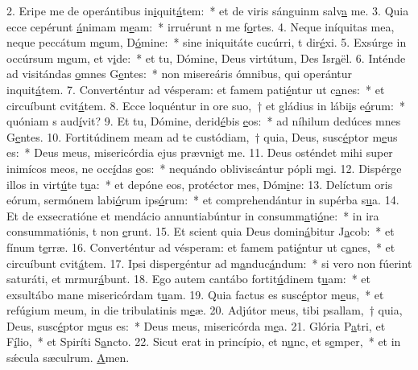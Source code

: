 2. Eripe me de operántibus in\uline{i}quit\uline{á}tem:~* et de viris sánguinm salv\uline{a} me.
3. Quia ecce cepérunt \uline{á}nimam m\uline{e}am:~* irruérunt n me f\uline{o}rtes.
4. Neque iníquitas mea, neque peccátum m\uline{e}um, D\uline{ó}mine:~* sine iniquitáte cucúrri, t dir\uline{é}xi.
5. Exsúrge in occúrsum m\uline{e}um, et v\uline{i}de:~* et tu, Dómine, Deus virtútum, Des Isr\uline{a}ël.
6. Inténde ad visitándas \uline{o}mnes G\uline{e}ntes:~* non misereáris ómnibus, qui operántur inquit\uline{á}tem.
7. Converténtur ad vésperam: et famem pati\uline{é}ntur ut c\uline{a}nes:~* et circuíbunt cvit\uline{á}tem.
8. Ecce loquéntur in ore suo,~† et gládius in lábi\uline{i}s e\uline{ó}rum:~* quóniam s aud\uline{í}vit?
9. Et tu, Dómine, derid\uline{é}bis \uline{e}os:~* ad níhilum dedúces mnes G\uline{e}ntes.
10. Fortitúdinem meam ad te custódiam,~† quia, Deus, susc\uline{é}ptor m\uline{e}us es:~* Deus meus, misericórdia ejus prævni\uline{e}t me.
11. Deus osténdet mihi super inimícos meos, ne occ\uline{í}das \uline{e}os:~* nequándo obliviscántur pópli m\uline{e}i.
12. Dispérge illos in virt\uline{ú}te t\uline{u}a:~* et depóne eos, protéctor mes, Dóm\uline{i}ne:
13. Delíctum oris eórum, sermónem labi\uline{ó}rum ips\uline{ó}rum:~* et comprehendántur in supérba s\uline{u}a.
14. Et de exsecratióne et mendácio annuntiabúntur in consumm\uline{a}ti\uline{ó}ne:~* in ira consummatiónis, t non \uline{e}runt.
15. Et scient quia Deus domin\uline{á}bitur J\uline{a}cob:~* et fínum t\uline{e}rræ.
16. Converténtur ad vésperam: et famem pati\uline{é}ntur ut c\uline{a}nes,~* et circuíbunt cvit\uline{á}tem.
17. Ipsi dispergéntur ad m\uline{a}nduc\uline{á}ndum:~* si vero non fúerint saturáti, et mrmur\uline{á}bunt.
18. Ego autem cantábo fortit\uline{ú}dinem t\uline{u}am:~* et exsultábo mane misericórdam t\uline{u}am.
19. Quia factus es susc\uline{é}ptor m\uline{e}us,~* et refúgium meum, in die tribulatinis m\uline{e}æ.
20. Adjútor meus, tibi psallam,~† quia, Deus, susc\uline{é}ptor m\uline{e}us es:~* Deus meus, misericórda m\uline{e}a.
21. Glória P\uline{a}tri, et F\uline{í}lio,~* et Spiríti S\uline{a}ncto.
22. Sicut erat in princípio, et n\uline{u}nc, et s\uline{e}mper,~* et in sǽcula sæculrum. \uline{A}men.
